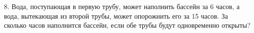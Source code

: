 8. Вода, поступающая в первую трубу, может наполнить бассейн за 6 часов, а вода, вытекающая из второй трубы, может опорожнить его за 15 часов. За сколько часов наполнится бассейн, если обе трубы будут одновременно открыты?\\
